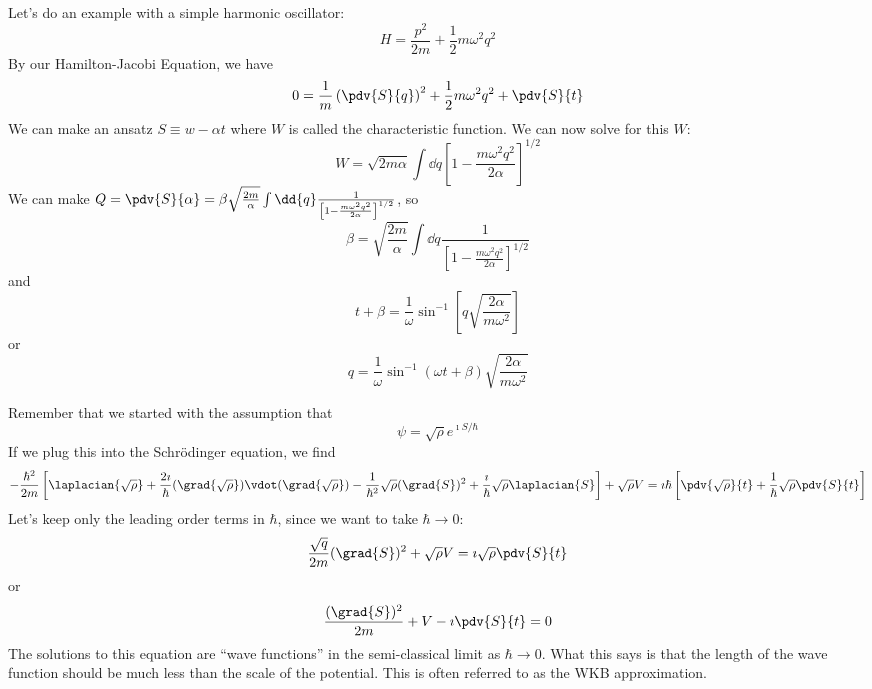 \documentclass[a4paper,twoside,master.tex]{subfiles}
\begin{document}
\begin{ex}
    Let's do an example with a simple harmonic oscillator:
    \begin{equation}
        H = \frac{p^2}{2m} + \frac{1}{2} m \omega^2 q^2
    \end{equation}
    By our Hamilton-Jacobi Equation, we have
    \begin{equation}
        0 = \frac{1}{m} \left( \pdv{S}{q} \right)^2 + \frac{1}{2} m \omega^2 q^2 + \pdv{S}{t}
    \end{equation}
    We can make an ansatz $ S \equiv w - \alpha t $ where $ W $ is called the characteristic function. We can now solve for this $ W $:
    \begin{equation}
        W = \sqrt{2m \alpha} \int \dd{q} \left[ 1- \frac{m \omega^2 q^2}{2 \alpha} \right]^{1/2}
    \end{equation}
    We can make $ Q = \pdv{S}{\alpha} = \beta \sqrt{\frac{2m}{\alpha}} \int \dd{q} \frac{1}{\left[ 1- \frac{m \omega^2 q^2}{2 \alpha} \right]^{1/2}} $, so
    \begin{equation}
        \beta = \sqrt{\frac{2m}{\alpha}} \int \dd{q} \frac{1}{\left[ 1 - \frac{m \omega^2 q^2}{2 \alpha} \right]^{1/2}}
    \end{equation}
    and
    \begin{equation}
        t + \beta = \frac{1}{\omega} \sin^{-1} \left[q\sqrt{\frac{2 \alpha}{m \omega^2}}\right]
    \end{equation}
    or
    \begin{equation}
        q = \frac{1}{\omega} \sin^{-1} (\omega t + \beta) \sqrt{\frac{2 \alpha}{m \omega^2}}
    \end{equation}
\end{ex}

Remember that we started with the assumption that
\begin{equation}
    \psi = \sqrt{\rho} e^{\imath S / \hbar}
\end{equation}
If we plug this into the Schr\"odinger equation, we find
\begin{equation}
    - \frac{\hbar^2}{2m} \left[ \laplacian{\sqrt{\rho}} + \frac{2 \imath}{\hbar} (\grad{\sqrt{\rho}}) \vdot (\grad{\sqrt{\rho}})- \frac{1}{\hbar^2} \sqrt{\rho} (\grad{S})^2 + \frac{\imath}{\hbar} \sqrt{\rho} \laplacian{S}\right] + \sqrt{\rho} V = \imath \hbar \left[ \pdv{\sqrt{\rho}}{t} + \frac{1}{\hbar} \sqrt{\rho} \pdv{S}{t} \right]
\end{equation}
Let's keep only the leading order terms in $ \hbar $, since we want to take $ \hbar \to 0 $:
\begin{equation}
    \frac{\sqrt{q}}{2m} (\grad{S})^2 + \sqrt{\rho} V = \imath \sqrt{\rho} \pdv{S}{t}
\end{equation}
or
\begin{equation}
    \frac{(\grad{S})^2}{2m} + V - \imath \pdv{S}{t} = 0
\end{equation}
The solutions to this equation are ``wave functions'' in the semi-classical limit as $ \hbar \to 0 $. What this says is that the length of the wave function should be much less than the scale of the potential. This is often referred to as the WKB approximation.
\end{document}
